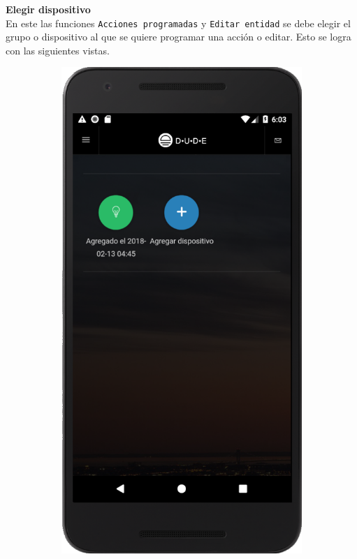 \textbf{Elegir dispositivo}\\
En este las funciones \lstinline[columns=fixed]{Acciones programadas} y \lstinline[columns=fixed]{Editar entidad} se debe elegir el grupo o dispositivo al que se quiere programar una acción o editar. Esto se logra con las siguientes vistas.~
\begin{figure}[H]
  \centering

  \begin{subfigure}[b]{0.2\textwidth}
    \includegraphics[width=\textwidth, keepaspectratio]{images/app-movil-choose-device}

\end{subfigure}
\end{figure}
